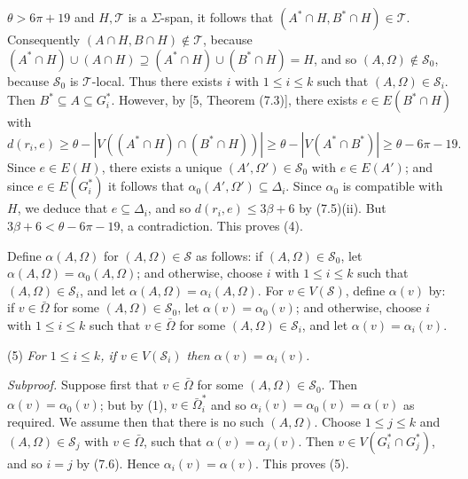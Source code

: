 \noindent $\theta > 6\pi + 19$ and $H, \mathscr{T}$ is a $\Sigma$-span, it follows that $(A^* \cap H, B^* \cap H) \in \mathscr{T}$. Consequently $(A \cap H, B \cap H) \notin \mathscr{T}$, because $(A^* \cap H) \cup (A \cap H) \supseteq (A^* \cap H) \cup (B^* \cap H) = H$, and so $(A, \Omega) \notin \mathscr{S}_0$, because $\mathscr{S}_0$ is $\mathscr{T}$-local. Thus there exists $i$ with $1 \le i \le k$ such that $(A, \Omega) \in \mathscr{S}_i$. Then $B^* \subseteq A \subseteq G_i^*$. However, by [5, Theorem (7.3)], there exists $e \in E(B^* \cap H)$ with
\begin{equation*}
d(r_i, e) \ge \theta - |V((A^* \cap H) \cap (B^* \cap H))| \ge \theta - |V(A^* \cap B^*)| \ge \theta - 6\pi - 19.
\end{equation*}
Since $e \in E(H)$, there exists a unique $(A', \Omega') \in \mathscr{S}_0$ with $e \in E(A')$; and since $e \in E(G_i^*)$ it follows that $\alpha_0(A', \Omega') \subseteq \Delta_i$. Since $\alpha_0$ is compatible with $H$, we deduce that $e \subseteq \Delta_i$, and so $d(r_i, e) \le 3\beta + 6$ by (7.5)(ii). But $3\beta + 6 < \theta - 6\pi - 19$, a contradiction. This proves (4).

Define $\alpha(A, \Omega)$ for $(A, \Omega) \in \mathscr{S}$ as follows: if $(A, \Omega) \in \mathscr{S}_0$, let $\alpha(A, \Omega) = \alpha_0(A, \Omega)$; and otherwise, choose $i$ with $1 \le i \le k$ such that $(A, \Omega) \in \mathscr{S}_i$, and let $\alpha(A, \Omega) = \alpha_i(A, \Omega)$. For $v \in V(\mathscr{S})$, define $\alpha(v)$ by: if $v \in \bar{\Omega}$ for some $(A, \Omega) \in \mathscr{S}_0$, let $\alpha(v) = \alpha_0(v)$; and otherwise, choose $i$ with $1 \le i \le k$ such that $v \in \bar{\Omega}$ for some $(A, \Omega) \in \mathscr{S}_i$, and let $\alpha(v) = \alpha_i(v)$.

\hspace*{12pt}(5) \textit{For $1 \le i \le k$, if $v \in V(\mathscr{S}_i)$ then $\alpha(v) = \alpha_i(v)$.}

\textit{Subproof.} Suppose first that $v \in \bar{\Omega}$ for some $(A, \Omega) \in \mathscr{S}_0$. Then $\alpha(v) = \alpha_0(v)$; but by (1), $v \in \bar{\Omega}_i^*$ and so $\alpha_i(v) = \alpha_0(v) = \alpha(v)$ as required. We assume then that there is no such $(A, \Omega)$. Choose $1 \le j \le k$ and $(A, \Omega) \in \mathscr{S}_j$ with $v \in \bar{\Omega}$, such that $\alpha(v) = \alpha_j(v)$. Then $v \in V(G_i^* \cap G_j^*)$, and so $i = j$ by (7.6). Hence $\alpha_i(v) = \alpha(v)$. This proves (5).

